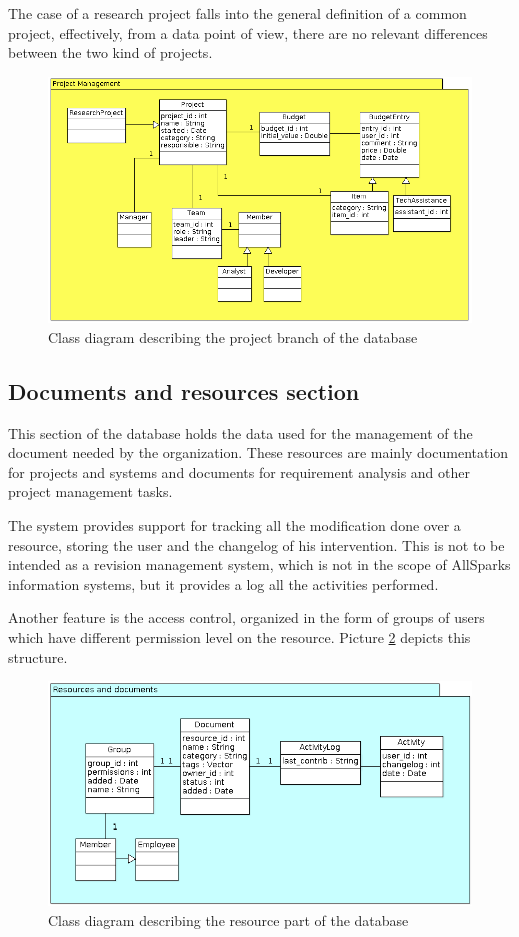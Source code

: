 The case of a research project falls into the general definition of a
common project, effectively, from a data point of view, there are no
relevant differences between the two kind of projects.

\begin{figure}[H]
\centering
\includegraphics[scale=0.50]{assign3/argo/imgs/project.png}
\caption{Class diagram describing the project branch of the database}
\label{3img:classprj}
\end{figure}

\subsection{Documents and resources section}
This section of the database holds the data used for the management of the
document needed by the organization. These resources are mainly
documentation for projects and systems and documents for requirement
analysis and other project management tasks.

The system provides support for tracking all the modification done over a
resource, storing the user and the changelog of his intervention. This is
not to be intended as a revision management system, which is not in the
scope of AllSparks information systems, but it provides a log all the
activities performed.

Another feature is the access control, organized in the form of groups of
users which have different permission level on the resource.
Picture \ref{3img:classres} depicts this structure.

\begin{figure}[H]
\centering
\includegraphics[scale=0.60]{assign3/argo/imgs/resources.png}
\caption{Class diagram describing the resource part of the database}
\label{3img:classres}
\end{figure}


